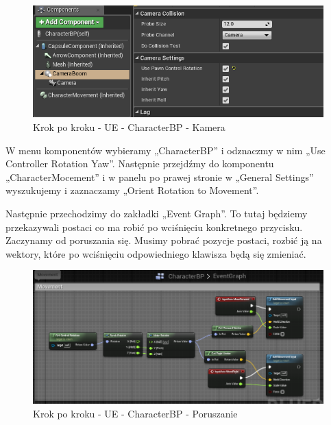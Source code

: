 \documentclass[openright]{xmgr}
\begin{document}
\begin{figure}[!htb]
    \begin{center}
    \includegraphics[scale=0.35]{Screeny/UeKrokPoKroku/UE-CharacterBP-Camera.png}
    \end{center}
    \caption{Krok po kroku - UE -  CharacterBP - Kamera}
\end{figure}

\newpage
W menu komponentów wybieramy „CharacterBP” i odznaczmy w nim „Use Controller Rotation Yaw”. Następnie przejdźmy do komponentu „CharacterMocement” i w panelu po prawej stronie w „General Settings” wyszukujemy i zaznaczamy „Orient Rotation to Movement”.

Następnie przechodzimy do zakładki „Event Graph”. To tutaj będziemy przekazywali postaci co ma robić po wciśnięciu konkretnego przycisku. Zaczynamy od poruszania się. Musimy pobrać pozycje postaci, rozbić ją na wektory, które po wciśnięciu odpowiedniego klawisza będą się zmieniać.

\begin{figure}[!htb]
    \begin{center}
    \includegraphics[scale=0.35]{Screeny/UeKrokPoKroku/UE-CharacterBP-Movement.png}
    \end{center}
    \caption{Krok po kroku - UE -  CharacterBP - Poruszanie}
\end{figure}
\end{document}
